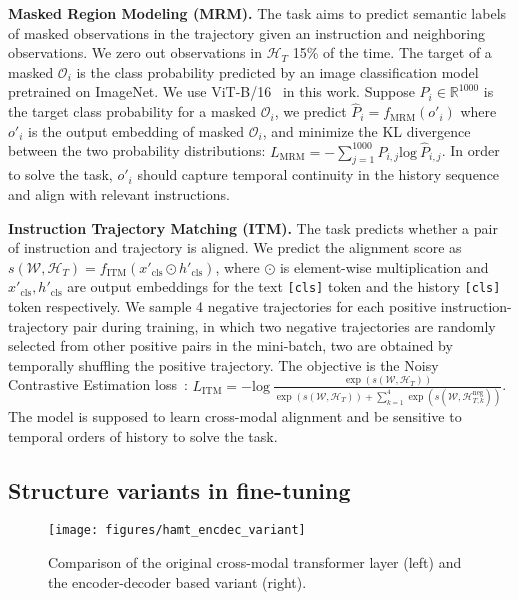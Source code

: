 \noindent\textbf{Masked Region Modeling (MRM).}
The task aims to predict semantic labels of masked observations in the trajectory given an instruction and neighboring observations.
We zero out observations in $\mathcal{H}_T$ 15\% of the time. The target of a masked $\mathcal{O}_i$ is the class probability predicted by an image classification model pretrained on ImageNet. We use ViT-B/16~\cite{dosovitskiy2020image} in this work. 
Suppose $P_i \in \mathbb{R}^{1000}$ is the target class probability for a masked $\mathcal{O}_i$, we predict $\hat{P}_i = f_{\text{MRM}}(o'_i)$ where $o'_i$ is the output embedding of masked $\mathcal{O}_i$, and minimize the KL divergence between the two probability distributions: $L_{\text{MRM}} = - \sum_{j=1}^{1000} P_{i,j} \mathrm{log}\ \hat{P}_{i,j}$.
In order to solve the task, $o'_i$ should capture temporal continuity in the history sequence and align with relevant instructions. 

\noindent\textbf{Instruction Trajectory Matching (ITM).}
The task predicts whether a pair of instruction and trajectory is aligned.
We predict the alignment score as $s(\mathcal{W}, \mathcal{H}_T) = f_{\text{ITM}}(x'_{\mathrm{cls}} \odot h'_{\mathrm{cls}})$, where $\odot$ is element-wise multiplication and $x'_{\mathrm{cls}}, h'_{\mathrm{cls}}$ are output embeddings for the text \verb|[cls]| token and the history \verb|[cls]| token respectively.
We sample 4 negative trajectories for each positive instruction-trajectory pair during training, in which two negative trajectories are randomly selected from other positive pairs in the mini-batch, two are obtained by temporally shuffling the positive trajectory.
The objective is the Noisy Contrastive Estimation loss~\cite{gutmann2010noise}: $L_{\text{ITM}} = -  \mathrm{log}\ \frac{\exp(s(\mathcal{W}, \mathcal{H}_T))}{\exp(s(\mathcal{W}, \mathcal{H}_T)) + \sum_{k=1}^{4} \exp(s(\mathcal{W}, \mathcal{H}_{T,k}^{\text{neg}}))}$.
The model is supposed to learn cross-modal alignment and be sensitive to temporal orders of history to solve the task.


\subsection{Structure variants in fine-tuning}
\label{sec:supp_hamt_nov2t}
\begin{wrapfigure}{r}{0.5\textwidth}
	\centering
	\vspace{-4em}
	\texttt{[image: figures/hamt\_encdec\_variant]}
	\caption{Comparison of the original cross-modal transformer layer (left) and the encoder-decoder based variant (right).}
	\label{fig:hamt_encdec_variant}
	\vspace{-4em}
\end{wrapfigure}


